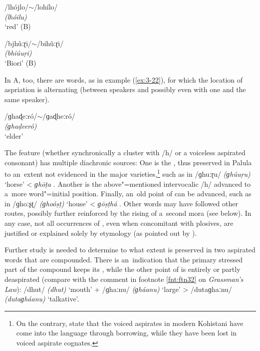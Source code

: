 \begin{exe}
\extab
\label{ex:3-20}
/lhójlo/$\sim$/lohílo/ \\
\textit{(lhóilu)} \\
`red' (B)

\extab
\label{ex:3-21}
/bjhûːɽi/$\sim$/bihûːɽi/ \\
\textit{(bhiúuṛi)} \\
`Biori' (B)
\end{exe}

In A, too, there are words, as in example (\ref{ex:3-22}), for which the location of aspriation is alternating (between speakers and possibly even with one and the same speaker).

\begin{exe}
\extab
\label{ex:3-22}
/ɡhaɖeːró/$\sim$/ɡaɖheːró/ \\
\textit{(ɡhaḍeeró)} \\
`elder'
\end{exe}

The  feature (whether synchronically a cluster with /h/ or a voiceless aspirated consonant) has multiple diachronic sources: One is the \iliOIA {}, thus preserved in Palula to an~extent not evidenced in the major \iliShina varieties,\footnote{On the contrary, \citet[30]{schmidtkohistani2008} state that the voiced aspirates in modern Kohistani \iliShina have come into the language through borrowing, while they have been lost in \iliOIA voiced aspirate cognates.} such as in /ɡhuːɽu/ \textit{(ɡhúuṛu)} `horse' {\textless} \iliOIA \textit{ɡhōṭa} \citep[4516]{turner1966}. Another is the above"=mentioned intervocalic /h/ advanced to a~more word"=initial position. Finally, an~old point of  can be advanced, such as in /ɡhoːʂʈ/ \textit{(ɡhoóṣṭ)} `house' {\textless} \iliOIA \textit{ɡōṣṭhá} \citep[4336]{turner1966}. Other words may have followed other routes, possibly further reinforced by the rising  of a~second mora  (see  below). In any case, not all occurrences of , even when concomitant with plosives, are justified or explained solely by etymology (as pointed out by \citealt[57]{morgenstierne1932}).


Further study is needed to determine to what extent  is preserved in two aspirated words that are compounded. There is an~indication that the primary stressed part of the compound keeps its , while the other point of  is entirely or partly deaspirated (compare with the comment in footnote \ref{fnt:ftn32} on \textit{Grassman's Law}): /dhut/ \textit{(dhut)} `mouth' + /ɡhaːnu/ \textit{(ɡháanu)} `large' {\textgreater} /dutaɡhaːnu/ \textit{(dutaɡháanu)} `talkative'.


